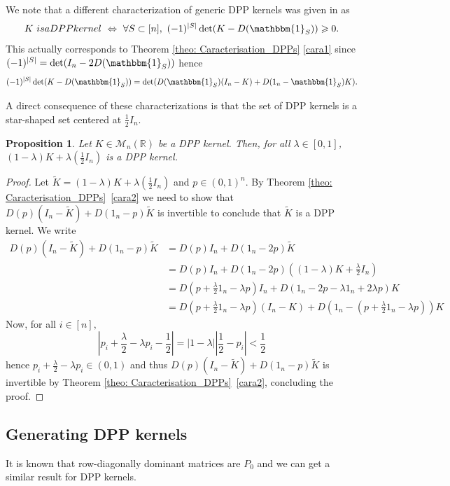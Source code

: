 \documentclass{article}
\numberwithin{equation}{section}
\renewcommand{\geq}{\geqslant}
\renewcommand{\tilde}{\widetilde}
\newcommand{\bR}{\mathbb{R}}
\newcommand{\cara}[1]{\mathbbm{1}_{#1}}
\theoremstyle{plain}
\newtheorem{proposition}{Proposition}[section]
\begin{document}
\noindent We note that a different characterization of generic DPP kernels was given in \cite{Brunel} as 
\[K~\textnormal{is a DPP kernel}~\Leftrightarrow~\forall S\subset [n],~(-1)^{|S|}\det(K - D(\cara{S})) \geq 0.\]
This actually corresponds to Theorem \ref{theo: Caracterisation_DPPs} \ref{cara1} since $(-1)^{|S|} = \det(I_n - 2D(\cara{S}))$ hence
\[(-1)^{|S|}\det(K - D(\cara{S})) = \det(D(\cara{S})(I_n-K)+D(1_n-\cara{S})K).\]

\noindent A direct consequence of these characterizations is that the set of DPP kernels is a star-shaped set centered at $\frac 1 2 I_n.$

\begin{proposition}\label{prop: star-shaped}
Let $K\in\mathcal{M}_n(\bR)$ be a DPP kernel. Then, for all $\lambda\in [0, 1]$, $(1-\lambda) K + \lambda\left(\frac 1 2 I_n\right)$ is a DPP kernel.
\end{proposition}
\begin{proof}
Let $\tilde K=(1-\lambda) K + \lambda\left(\frac 1 2 I_n\right)$ and $p\in (0, 1)^n$. By Theorem \ref{theo: Caracterisation_DPPs}~\ref{cara2} we need to show that $D(p)(I_n-\tilde K) + D(1_n-p)\tilde K$ is invertible to conclude that $\tilde K$ is a DPP kernel. We write
\begin{align*}
D(p)(I_n-\tilde K) + D(1_n-p)\tilde K&= D(p)I_n+D(1_n-2p)\tilde K\\
&= D(p)I_n+D(1_n-2p)\left((1-\lambda) K + \frac \lambda 2 I_n\right)\\
&= D\left(p + \frac \lambda 2 1_n - \lambda p\right)I_n+D(1_n-2p-\lambda 1_n + 2\lambda p)K\\
&= D\left(p + \frac \lambda 2 1_n - \lambda p\right)(I_n-K) + D\left(1_n-\left(p + \frac \lambda 2 1_n - \lambda p\right)\right)K
\end{align*}
Now, for all $i\in [n],$
\[\left|p_i + \frac \lambda 2 - \lambda p_i - \frac 1 2\right|=|1-\lambda|\left|\frac 1 2 - p_i\right|< \frac 1 2\]
hence $p_i + \frac \lambda 2 - \lambda p_i\in (0, 1)$ and thus $D(p)(I_n-\tilde K) + D(1_n-p)\tilde K$ is invertible by Theorem \ref{theo: Caracterisation_DPPs}~\ref{cara2}, concluding the proof.
\end{proof}

\subsection{Generating DPP kernels}

It is known that row-diagonally dominant matrices are $P_0$ \cite[Proposition 4.5.1]{Johnson20} and we can get a similar result for DPP kernels.
\end{document}
